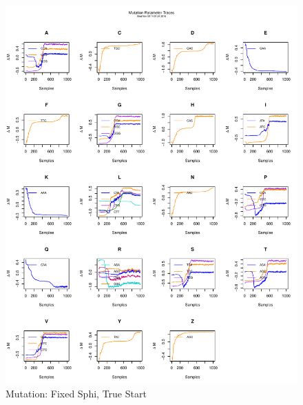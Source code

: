 \documentclass[11pt]{labbook}
\begin{document}
    \begin{figure}
        \centering
        \includegraphics[scale=.65]{FONSE_Plots/2016/November_8/fixedSphi_sim_mut}
        \caption{Mutation: Fixed Sphi, True Start}
        \label{fig:NOV8_F.S.MUT}
    \end{figure}
\end{document}
